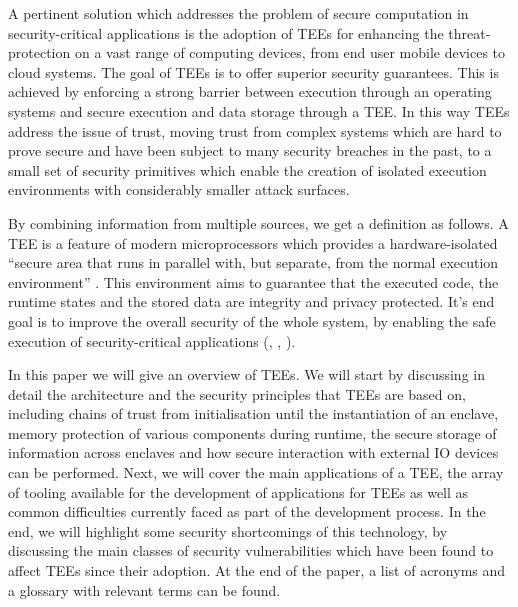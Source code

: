 \documentclass[runningheads,a4paper]{uwsese}
\begin{document}
A pertinent solution which addresses the problem of secure computation in
security-critical applications is the adoption of \glspl{TEE} for enhancing the
threat-protection on a vast range of computing devices, from end user mobile
devices to cloud systems. The goal of \glspl{TEE} is to offer superior
security guarantees. This is achieved by enforcing a strong barrier between
execution through an operating systems and secure execution and data storage
through a \gls{TEE}. In this way \glspl{TEE} address the issue of trust, moving
trust from complex systems which are hard to prove secure and have been
subject to many security breaches in the past, to a small set of security
primitives which enable the creation of isolated execution environments with
considerably smaller attack surfaces.

By combining information from multiple sources, we get a definition as
follows. A \gls{TEE} is a feature of modern microprocessors which provides a
hardware-isolated ``secure area that runs in parallel with, but separate, from
the normal execution environment'' \cite{tee_ieee_standard}. This environment
aims to guarantee that the executed code, the runtime states and the stored
data are integrity and privacy protected. It's end goal is to improve the
overall security of the whole system, by enabling the safe execution of
security-critical applications (\cite{tee_app_rev}, \cite{tee_in_securities},
\cite{tee_is_and_not}).

In this paper we will give an overview of \glspl{TEE}. We will start by
discussing in detail the architecture and the security principles that
\glspl{TEE} are based on, including chains of trust from initialisation until the
instantiation of an \gls{enclave}, memory protection of various components
during runtime, the secure storage of information across enclaves and how
secure interaction with external IO devices can be performed. Next, we will
cover the main applications of a \gls{TEE}, the array of tooling available for
the development of applications for \glspl{TEE} as well as common difficulties
currently faced as part of the development process. In the end, we will highlight
some security shortcomings of this technology, by discussing the main classes
of security vulnerabilities which have been found to affect \glspl{TEE} since
their adoption. At the end of the paper, a list of acronyms and a glossary with
relevant terms can be found.


\end{document}
